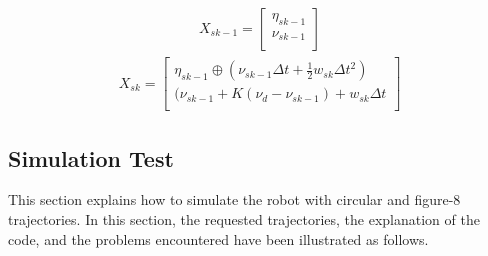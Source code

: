 \documentclass[letterpaper,12pt]{article}
\begin{document}
\begin{equation}
    \label{eq:prev_pose}
\begin{aligned}
    X_{sk-1} =
    \begin{bmatrix}
   \eta_{sk-1}\\ \nu_{sk-1} 
   \\ \end{bmatrix}
    \end{aligned}
\end{equation}
\begin{equation}
    \label{eq:current_pose}
\begin{aligned}
    X_{sk} =
    \begin{bmatrix}
   \eta_{sk-1} \oplus (\nu_{sk-1}\Delta t + \frac{1}{2} w_{sk} \Delta t^2 )\\  (\nu_{sk-1} + K(\nu_{d} - \nu_{sk-1}) + w_{sk} \Delta t\\ \end{bmatrix}
\end{aligned}
\end{equation}


\subsection{Simulation Test}
\label{sec:SimulationTest}
This section explains how to simulate the robot with circular and figure-8 trajectories. In this section, the requested trajectories, the explanation of the code, and the problems encountered have been illustrated as follows.
\end{document}
